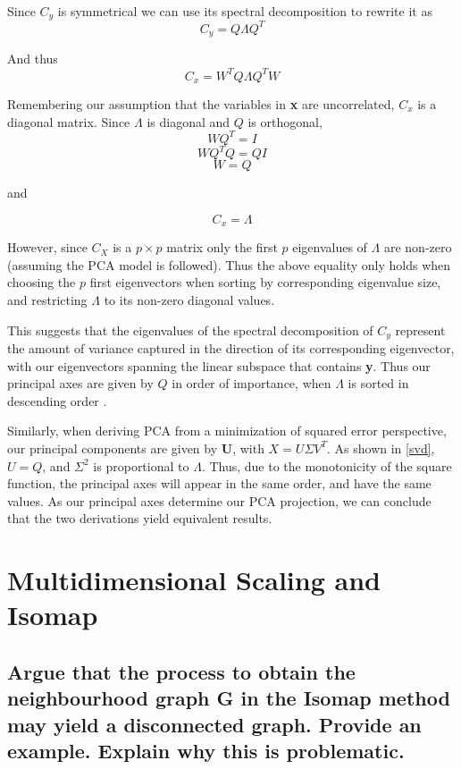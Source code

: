 \documentclass[11pt,a4paper,landscape]{article}
\begin{document}
Since $ C_{y} $ is symmetrical we can use its spectral decomposition to rewrite it as
$$ C_{y} = Q\Lambda Q^{T} $$

And thus
$$C_{x} = W^{T}Q\Lambda Q^{T}W$$

Remembering our assumption that the variables in \textbf{x} are uncorrelated,  $C_{x}$ is a diagonal matrix. Since $\Lambda$ is diagonal and $Q$ is orthogonal, 
$$WQ^{T} = I$$
$$WQ^{T}Q=QI$$
$$W= Q$$

and

$$ C_{x} = \Lambda $$

However, since $C_{X}$ is a $p\times p$ matrix only the first $p$ eigenvalues of $\Lambda$ are non-zero (assuming the PCA model is followed). Thus the above equality only holds when choosing the $p$ first eigenvectors when sorting by corresponding eigenvalue size, and restricting $\Lambda$ to its non-zero diagonal values. \newline

This suggests that the eigenvalues of the spectral decomposition of $C_{y}$ represent the amount of variance captured in the direction of its corresponding eigenvector, with our eigenvectors spanning the linear subspace that contains \textbf{y}. Thus our principal axes are given by $Q$ in order of importance, when $\Lambda$ is sorted in descending order \cite{book}.\newline

Similarly, when deriving PCA from a minimization of squared error perspective, our principal components are given by \textbf{U}, with $X = U\Sigma V^{T}$. As shown in \ref{svd}, $U = Q$, and $\Sigma^2$ is proportional to $\Lambda$. Thus, due to the monotonicity of the square function, the principal axes will appear in the same order, and have the same values. As our principal axes determine our PCA projection, we can conclude that the two derivations yield equivalent results\cite{book}.



\section{Multidimensional Scaling and Isomap}

\subsection{Argue that the process to obtain the neighbourhood graph G in the Isomap method may yield a disconnected graph.  Provide an example.  Explain why this is problematic.}
\end{document}
